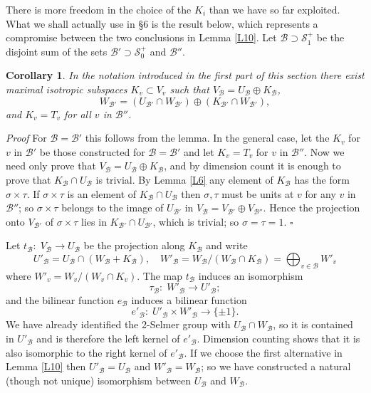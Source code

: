 \documentclass[12pt]{article}
\def\gs{{\sigma}}
\def\sB{{\mathcal B}}
\def\sS{{\mathcal S}}
\def\qed{{\hfill$\square$}}
\newtheorem{Cor}{Corollary}
\begin{document}
There is more freedom in the choice of the $K_i$ than
we have so far exploited. What we shall actually use in \S6
is the result below, which represents a compromise between
the two conclusions in Lemma
\ref{L10}. Let $\sB\supset\sS^+_1$ be the disjoint sum of
the sets $\sB'\supset\sS^+_0$ and $\sB''$.
\begin{Cor} In the notation introduced in the first part of
this section there exist maximal
isotropic subspaces $K_v\subset V_v$ such that $V_\sB=U_\sB\oplus K_\sB$,
\[ W_{\sB'}=(U_{\sB'}\cap W_{\sB'})\oplus(K_{\sB'}\cap W_{\sB'}), \]
and $K_v=T_v$ for all $v$ in $\sB''$.
\end{Cor}
\emph{Proof} For $\sB=\sB'$ this follows from the lemma. In the general
case, let the $K_v$ for $v$ in $\sB'$ be those constructed for $\sB=\sB'$
and let $K_v=T_v$ for $v$  in $\sB''$. Now we need only prove
that $V_\sB=U_\sB\oplus K_\sB$, and by dimension count it is
enough to prove that $K_\sB\cap U_\sB$ is trivial. By
Lemma \ref{L6} any element of $K_\sB$  has the
form $\gs\times\tau$. If $\gs\times\tau$ is an element
of $K_\sB\cap U_\sB$ then $\gs,\tau$ must be units at $v$ for any $v$ in
$\sB''$; so $\gs\times\tau$
belongs to the image of $U_{\sB'}$ in $V_\sB=V_{\sB'}\oplus V_{\sB''}$.
Hence the projection onto $V_{\sB'}$ of $\gs\times\tau$ lies in $K_{\sB'}
\cap U_{\sB'}$, which is trivial; so $\gs=\tau=1$.  \qed

Let $t_\sB:\;V_\sB\rightarrow U_\sB$ be the projection along $K_\sB$ and
write
\[ U'_\sB=U_\sB\cap(W_\sB+K_\sB), \quad
W'_\sB=W_\sB/(W_\sB\cap K_\sB)={\bigoplus}_{v\in\sB}W'_v \]
where $W'_v=W_v/(W_v\cap K_v)$. The map $t_\sB$ induces an isomorphism
\[ \tau_\sB:\;W'_\sB\rightarrow U'_\sB; \]
and the bilinear function $e_\sB$ induces a bilinear function
\[ e'_\sB:\;U'_\sB\times W'_\sB\rightarrow\{\pm1\}. \]
We have already identified the 2-Selmer group with $U_\sB\cap
W_\sB$, so it is contained in $U'_\sB$ and is therefore
the left kernel of $e'_\sB$. Dimension counting shows that it
is also isomorphic to the right kernel of $e'_\sB$. If we
choose the first alternative in Lemma \ref{L10} then
$U'_\sB=U_\sB$ and $W'_\sB=W_\sB$; so we have
constructed a natural (though not unique) isomorphism between
$U_\sB$ and $W_\sB$.
\end{document}
